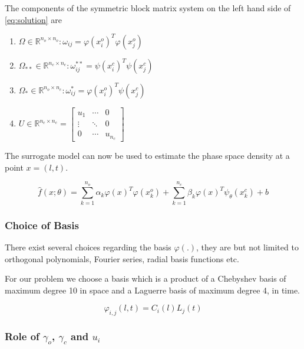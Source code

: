 The components of the symmetric block matrix system on the left hand side of 
\ref{eq:solution} are 
\begin{enumerate}
\item $\Omega \in \mathbb{R}^{n_{o} \times n_{o}}: \omega_{ij} = \varphi(x^{o}_{i})^{T} \varphi(x^{o}_{j})$
\item $\Omega_{**} \in \mathbb{R}^{n_{c} \times n_{c}}: \omega^{**}_{ij} = \psi(x^{c}_{i})^{T} \psi(x^{c}_{j})$
\item $\Omega_{*} \in \mathbb{R}^{n_{o} \times n_{c}}: \omega^{*}_{ij} = \varphi(x^{o}_{i})^{T} \psi(x^{c}_{j})$
\item $U \in \mathbb{R}^{n_{c} \times n_{c}} = \begin{bmatrix}
    u_1 & \cdots & 0 \\ 
    \vdots & \ddots  & 0\\ 
    0 & \cdots  & u_{n_{c}} 
  \end{bmatrix}$
\end{enumerate}

The surrogate model can now be used to estimate the phase space density 
at a point $x = (l,t)$.

\begin{equation}\label{eq:model}
\hat{f}(x;\theta) = \sum_{k = 1}^{n_{o}}{\alpha_{k}\varphi(x)^{T}\varphi(x^{o}_{k}) + \sum_{k = 1}^{n_{c}}}{\beta_{k} \varphi(x)^{T} \psi_{\theta}(x^{c}_{k})} + b
\end{equation}

\subsubsection*{Choice of Basis}

There exist several choices regarding the basis $\varphi(.)$, they are but not limited to 
orthogonal polynomials, Fourier series, radial basis functions etc. 

For our problem we choose a basis which is a product of a Chebyshev basis of maximum degree 10 in space and a Laguerre basis of maximum degree 4, in time.

\begin{equation}\label{eq:basis}
\varphi_{i,j}(l,t) = C_{i}(l) L_{j}(t)
\end{equation}



\subsubsection*{Role of $\gamma_o$, $\gamma_c$ and $u_i$}


